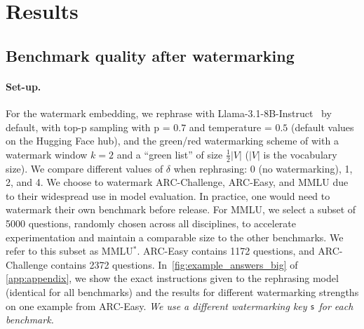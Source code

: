\vspace{-0.2cm}
\section{Results}\label{sec:results}




\subsection{Benchmark quality after watermarking}\label{subsec:results_rephrasing}


\paragraph{\textbf{Set-up.}}
For the watermark embedding, we rephrase with Llama-3.1-8B-Instruct~\citep{dubey2024llama} by default, with top-p sampling with p = $0.7$ and temperature = $0.5$ (default values on the Hugging Face hub), and the green/red watermarking scheme of \citet{kirchenbauer2023reliability} with a watermark window $k=2$ and a ``green list'' of
size $\frac{1}{2}|V|$ ($|V|$ is the vocabulary size).
We compare different values of $\delta$ when rephrasing: 0 (no watermarking), 1, 2, and 4.
We choose to watermark ARC-Challenge, ARC-Easy, and MMLU due to their widespread use in model evaluation.
In practice, one would need to watermark their own benchmark before release.
For MMLU, we select a subset of 5000 questions, randomly chosen across all disciplines, to accelerate experimentation and maintain a comparable size to the other benchmarks.
We refer to this subset as MMLU$^*$.
ARC-Easy contains 1172 questions, and ARC-Challenge contains 2372 questions.
In~\autoref{fig:example_answers_big} of \autoref{app:appendix}, we show the exact instructions given to the rephrasing model (identical for all benchmarks) and the results for different watermarking strengths on one example from ARC-Easy.
\emph{We use a different watermarking key $\mathsf{s}$ for each benchmark.}


